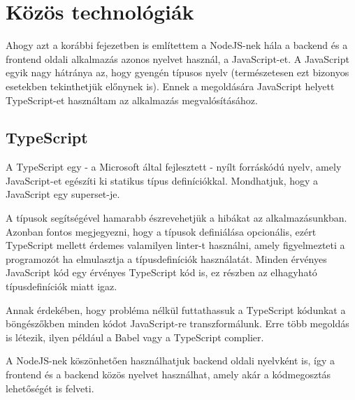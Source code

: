 \section{Közös technológiák}
Ahogy azt a korábbi fejezetben is említettem a NodeJS-nek hála a backend és a frontend oldali alkalmazás azonos nyelvet használ, a JavaScript-et.
A JavaScript egyik nagy hátránya az, hogy gyengén típusos nyelv (természetesen ezt bizonyos esetekben tekinthetjük előnynek is). Ennek a megoldására JavaScript helyett TypeScript-et használtam az alkalmazás megvalósításához.

\subsection{TypeScript}

A TypeScript egy - a Microsoft által fejlesztett - nyílt forráskódú nyelv, amely JavaScript-et egészíti ki statikus típus definíciókkal. Mondhatjuk, hogy a JavaScript egy superset-je.

A típusok segítségével hamarabb észrevehetjük a hibákat az alkalmazásunkban. Azonban fontos megjegyezni, hogy a típusok definiálása opcionális, ezért TypeScript mellett érdemes valamilyen linter-t használni, amely figyelmezteti a programozót ha elmulasztja a típusdefiníciók használatát. 
Minden érvényes JavaScript kód egy érvényes TypeScript kód is, ez részben az elhagyható típusdefiníciók miatt igaz.

Annak érdekében, hogy probléma nélkül futtathassuk a TypeScript kódunkat a böngészőkben minden kódot JavaScript-re transzformálunk. Erre több megoldás is létezik, ilyen például a Babel vagy a TypeScript complier.

A NodeJS-nek köszönhetően használhatjuk backend oldali nyelvként is, így a frontend és a backend közös nyelvet használhat, amely akár a kódmegosztás lehetőségét is felveti.
